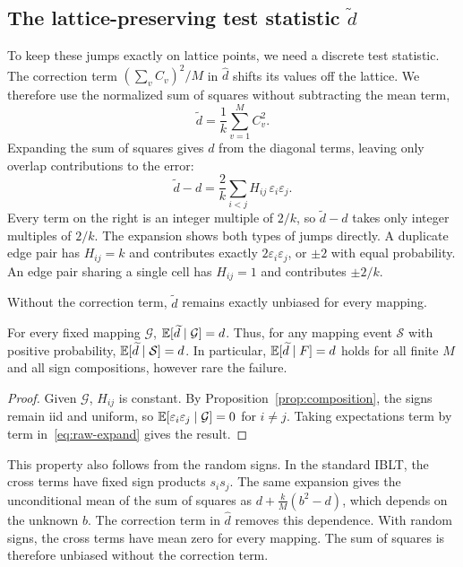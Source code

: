 \subsection{The lattice-preserving test statistic \texorpdfstring{$\widetilde d$}{d~}}\label{sec:raw}
To keep these jumps exactly on lattice points, we need a discrete test statistic. The correction term $(\sum_vC_v)^2/M$ in $\widehat d$ shifts its values off the lattice. We therefore use the normalized sum of squares without subtracting the mean term,
\begin{equation}
\widetilde d=\frac1k\sum_{v=1}^M C_v^2.\label{eq:raw-energy}
\end{equation}
Expanding the sum of squares gives $d$ from the diagonal terms, leaving only overlap contributions to the error:
\begin{equation}
\widetilde d-d=\frac2k\sum_{i<j}H_{ij}\,\varepsilon_i\varepsilon_j.\label{eq:raw-expand}
\end{equation}
Every term on the right is an integer multiple of $2/k$, so $\widetilde d-d$ takes only integer multiples of $2/k$. The expansion shows both types of jumps directly. A duplicate edge pair has $H_{ij}=k$ and contributes exactly $2\varepsilon_i\varepsilon_j$, or $\pm2$ with equal probability. An edge pair sharing a single cell has $H_{ij}=1$ and contributes $\pm2/k$.

Without the correction term, $\widetilde d$ remains exactly unbiased for every mapping.

\begin{proposition}\label{prop:raw-unbiased}
For every fixed mapping $\mathcal G$, $\mathbb E[\widetilde d\mid\mathcal G]=d$. Thus, for any mapping event $\mathcal S$ with positive probability, $\mathbb E[\widetilde d\mid\mathcal S]=d$. In particular, $\mathbb E[\widetilde d\mid F]=d$ holds for all finite $M$ and all sign compositions, however rare the failure.
\end{proposition}

\begin{proof}
Given $\mathcal G$, $H_{ij}$ is constant. By Proposition~\ref{prop:composition}, the signs remain iid and uniform, so $\mathbb E[\varepsilon_i\varepsilon_j\mid\mathcal G]=0$ for $i\ne j$. Taking expectations term by term in~\eqref{eq:raw-expand} gives the result.
\end{proof}

This property also follows from the random signs. In the standard IBLT, the cross terms have fixed sign products $s_is_j$. The same expansion gives the unconditional mean of the sum of squares as $d+\frac kM(b^2-d)$, which depends on the unknown $b$. The correction term in $\widehat d$ removes this dependence. With random signs, the cross terms have mean zero for every mapping. The sum of squares is therefore unbiased without the correction term.

